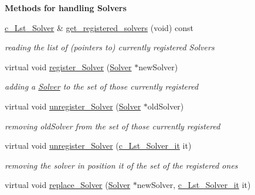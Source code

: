 \begin{Indent}\textbf{ Methods for handling Solvers}\par
\begin{DoxyCompactItemize}
\item 
\mbox{\hyperlink{namespace_s_m_spp__di__unipi__it_aa4d2cd4385e5eb96e9807bbdc1490b3b}{c\+\_\+\+Lst\+\_\+\+Solver}} \& \mbox{\hyperlink{class_s_m_spp__di__unipi__it_1_1_block_a052e250efe81b0840361e70c520bdd7f}{get\+\_\+registered\+\_\+solvers}} (void) const
\begin{DoxyCompactList}\small\item\em reading the list of (pointers to) currently registered Solvers \end{DoxyCompactList}\item 
virtual void \mbox{\hyperlink{class_s_m_spp__di__unipi__it_1_1_block_a4bf9d1856367faf430d0143a6ee55655}{register\+\_\+\+Solver}} (\mbox{\hyperlink{class_s_m_spp__di__unipi__it_1_1_solver}{Solver}} $\ast$new\+Solver)
\begin{DoxyCompactList}\small\item\em adding a \mbox{\hyperlink{class_s_m_spp__di__unipi__it_1_1_solver}{Solver}} to the set of those currently registered \end{DoxyCompactList}\item 
virtual void \mbox{\hyperlink{class_s_m_spp__di__unipi__it_1_1_block_a1be1159f846ad7809d2d0c5c2311c92e}{unregister\+\_\+\+Solver}} (\mbox{\hyperlink{class_s_m_spp__di__unipi__it_1_1_solver}{Solver}} $\ast$old\+Solver)
\begin{DoxyCompactList}\small\item\em removing old\+Solver from the set of those currently registered \end{DoxyCompactList}\item 
virtual void \mbox{\hyperlink{class_s_m_spp__di__unipi__it_1_1_block_a5cd5238acd84dd259f3bedb0da4e64c3}{unregister\+\_\+\+Solver}} (\mbox{\hyperlink{namespace_s_m_spp__di__unipi__it_a8d60e91b37db595a92964f6f4a52bf17}{c\+\_\+\+Lst\+\_\+\+Solver\+\_\+it}} it)
\begin{DoxyCompactList}\small\item\em removing the solver in position it of the set of the registered ones \end{DoxyCompactList}\item 
virtual void \mbox{\hyperlink{class_s_m_spp__di__unipi__it_1_1_block_ae7306554741d39d82838487ae623daed}{replace\+\_\+\+Solver}} (\mbox{\hyperlink{class_s_m_spp__di__unipi__it_1_1_solver}{Solver}} $\ast$new\+Solver, \mbox{\hyperlink{namespace_s_m_spp__di__unipi__it_a8d60e91b37db595a92964f6f4a52bf17}{c\+\_\+\+Lst\+\_\+\+Solver\+\_\+it}} it)

\end{DoxyCompactItemize}
\end{Indent}
